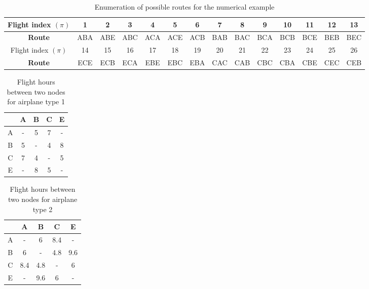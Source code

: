 \begin{table}[H]
	\caption{Enumeration of possible routes for the numerical example \cite{journal:AF2004}}
	\label{cargo:routes}
	\resizebox{\textwidth}{!}
	{
	\begin{tabular}{|c|c|c|c|c|c|c|c|c|c|c|c|c|c|}
		\hline
		Flight index $(\pi)$                           & 1   & 2   & 3   & 4   & 5   & 6   & 7   & 8   & 9   & 10  & 11  & 12  & 13  \\ \hline
		\textbf{Route} & ABA & ABE & ABC & ACA & ACE & ACB & BAB & BAC & BCA & BCB & BCE & BEB & BEC \\ \hline
		Flight index $(\pi)$                           & 14  & 15  & 16  & 17  & 18  & 19  & 20  & 21  & 22  & 23  & 24  & 25  & 26  \\ \hline
		\textbf{Route} & ECE & ECB & ECA & EBE & EBC & EBA & CAC & CAB & CBC & CBA & CBE & CEC & CEB \\ \hline
	\end{tabular}
	}
\end{table}

\begin{table}[H]
	\centering
	\caption{Flight hours between two nodes for airplane type 1 \cite{journal:AF2004}}
	\label{cargo:air1}
	\begin{tabular}{|c|c|c|c|c|}
		\hline
		& A & B & C & E \\ \hline
		A & - & 5 & 7 & - \\ \hline
		B & 5 & - & 4 & 8 \\ \hline
		C & 7 & 4 & - & 5 \\ \hline
		E & - & 8 & 5 & - \\ \hline
	\end{tabular}
\end{table}

\begin{table}[H]
	\centering
	\caption{Flight hours between two nodes for airplane type 2 \cite{journal:AF2004}}
	\label{cargo:air2}	
	\begin{tabular}{|c|c|c|c|c|}
		\hline
		& A & B & C & E \\ \hline
		A & - & 6 & 8.4 & - \\ \hline
		B & 6 & - & 4.8 & 9.6 \\ \hline
		C & 8.4 & 4.8 & - & 6 \\ \hline
		E & - & 9.6 & 6 & - \\ \hline
	\end{tabular}
\end{table}

